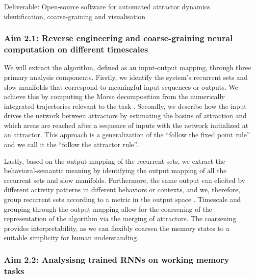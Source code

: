 \documentclass[12pt,letterpaper, onecolumn]{article}
\theoremstyle{definition}
\theoremstyle{remark}
\begin{document}
\noindent
Deliverable: Open-source software for automated attractor dynamics identification, coarse-graining and visualisation


\subsubsection*{Aim 2.1: Reverse engineering and coarse-graining neural computation on different timescales}
We will extract the algorithm, defined as an input-output mapping, through three primary analysis components.
Firstly, we identify the system's recurrent sets and slow manifolds that correspond to meaningful input sequences or outputs.  %
We achieve this by computing the Morse decomposition from the numerically integrated trajectories relevant to the task \citep{arai2009database}.
Secondly, we describe how the input drives the network between attractors by estimating the basins of attraction and which areas are reached after a sequence of inputs with the network initialized at an attractor. 
This approach is a generalization of the ``follow the fixed point rule'' \citep{sussillo2013blackbox} and we call it the ``follow the attractor rule''.


Lastly, based on the output mapping of the recurrent sets, we extract the behavioral-semantic meaning by identifying the output mapping of all the recurrent sets and slow manifolds. Furthermore, the same output can elicited by different activity patterns in different behaviors or contexts, and we, therefore, group recurrent sets according to a metric in the output space \citep{myers2022}. %
Timescale and grouping through the output mapping allow for the coarsening of the representation of the algorithm via the merging of attractors. %
The coarsening provides interpretability, as we can flexibly coarsen the memory states to a suitable simplicity for human understanding.

%
\subsubsection*{Aim 2.2: Analysisng trained RNNs on working memory tasks}
\end{document}
